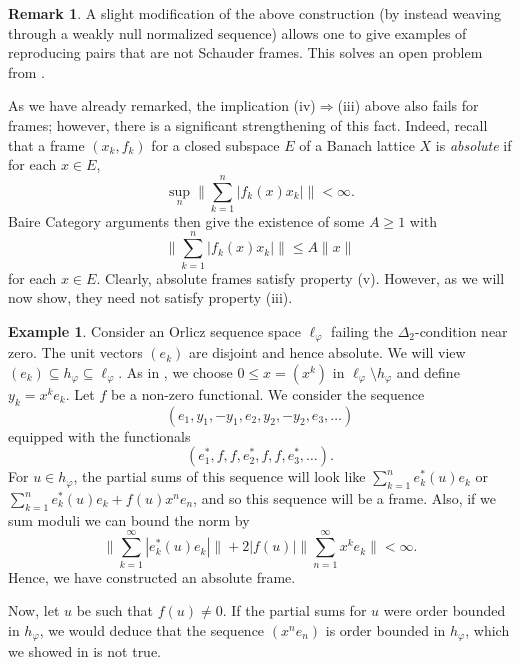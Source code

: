 \documentclass[12pt,leqno]{amsart}
\numberwithin{equation}{section}
\theoremstyle{definition}
\newtheorem{remark}[theorem]{Remark}
\newtheorem{example}[theorem]{Example}
\newcommand{\term}[1]{{\textit{#1}}}   %
\begin{document}
\begin{remark}
    A slight modification of the above construction (by instead weaving through a weakly null normalized sequence) allows one to give examples of reproducing pairs that are not Schauder frames. This solves an open problem from \cite{hart2023overcomplete}.
\end{remark}
As we have already remarked, the implication (iv)$\Rightarrow$(iii) above also fails for frames; however, there is a significant strengthening of this fact. Indeed, recall that a frame $(x_k,f_k)$ for a closed subspace $E$ of a Banach lattice $X$ is \term{absolute} if for each $x\in E$,
$$\sup_n \bigg\|\sum_{k=1}^n\left|f_k(x)x_k\right|\bigg\|<\infty.$$
Baire Category arguments then give the existence of some $A\geq 1$ with  
$$ \bigg\|\sum_{k=1}^n\left|f_k(x)x_k\right|\bigg\|\leq A\|x\|$$ for each $x\in E$. Clearly, absolute frames satisfy property (v). However, as we will now show, they need not satisfy property (iii).
\begin{example}\label{Mon is nec}
Consider an Orlicz sequence space $\ell_{\varphi}$ failing the $\Delta_2$-condition near zero. The unit vectors $(e_k)$ are disjoint and hence absolute. We will view  $(e_k)\subseteq h_\varphi \subseteq \ell_{\varphi}$. As in , we choose $0\leq x=(x^k)$ in $\ell_\varphi \setminus h_\varphi$ and define $y_k=x^ke_k$.
Let $f$ be a non-zero functional. We  consider the sequence
$$(e_1, y_1,-y_1, e_2, y_2, -y_2, e_3,\dots)$$
equipped with the functionals
$$(e_1^{*}, f, f, e_2^*, f, f, e_3^*,\dots).$$
For $u\in h_{\varphi}$, the partial sums  of this sequence will look like 
$\sum_{k=1}^n e_k^*(u)e_k$ or $\sum_{k=1}^n e_k^*(u)e_k +f(u)x^ne_n$, and so this sequence will be a frame.
Also, if we sum moduli we can bound the norm by $$\|\sum_{k=1}^\infty |e_k^*(u)e_k|\|+2|f(u)|\|\sum_{n=1}^\infty x^ke_k\|<\infty.$$ Hence, we have constructed an absolute frame.
\medskip

Now, let $u$ be such that $f(u)\neq 0$. If the partial sums for $u$ were order bounded in $h_{\varphi}$, we would deduce that the sequence $(x^ne_n)$ is order bounded in $h_{\varphi}$, which we showed in  is not true.
\end{example}
\end{document}

